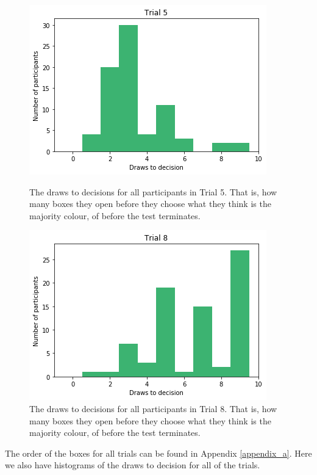 \begin{figure}
    \centering
    \begin{minipage}{0.45\textwidth}
        \centering
        \includegraphics[scale=0.4]{pictures/dtd5_histogram.png}
        \caption[Draws to Decisions in Trial 5]{The draws to decisions for all participants in Trial 5. That is, how many boxes they open before they choose what they think is the majority colour, of before the test terminates.}
        \label{fig:histogram_trial5}
    \end{minipage}\hfill
    \begin{minipage}{0.45\textwidth}
        \centering
        \includegraphics[scale=0.4]{pictures/dtd8_histogram.png}
        \caption[Draws to Decisions in Trial 8]{The draws to decisions for all participants in Trial 8. That is, how many boxes they open before they choose what they think is the majority colour, of before the test terminates.}
        \label{fig:histogram_trial8}
    \end{minipage}
\end{figure}

The order of the boxes for all trials can be found in Appendix \ref{appendix_a}. Here we also have histograms of the draws to decision for all of the trials.

